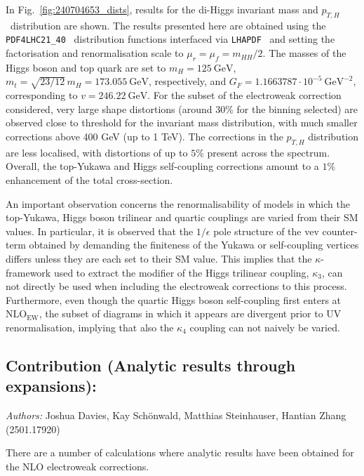In Fig.~\ref{fig:240704653_dists}, results for the di-Higgs invariant mass and $p_{T,H}$~distribution are shown.
The results presented here are obtained using the \texttt{PDF4LHC21\_40}~\cite{PDF4LHCWorkingGroup:2022cjn} distribution functions interfaced via \texttt{LHAPDF}~\cite{Buckley:2014ana} and setting the factorisation and renormalisation scale to $\mu_r = \mu_f = m_{HH}/2$. The masses of the Higgs boson and top quark are set to $m_H = 125~\mathrm{GeV}$, $m_t = \sqrt{23/12}\,m_H =173.055~\mathrm{GeV}$, respectively, and $G_F = 1.1663787 \cdot 10^{-5} \ \mathrm{GeV}^{-2}$, corresponding to $v=246.22~\mathrm{GeV}$.
For the subset of the electroweak correction considered, very large shape distortions (around $30\%$ for the binning selected) are observed close to threshold for the invariant mass distribution, with much smaller corrections above 400 GeV (up to 1 TeV).
The corrections in the $p_{T,H}$ distribution are less localised, with distortions of up to $5\%$ present across the spectrum.
Overall, the top-Yukawa and Higgs self-coupling corrections amount to a $1\%$ enhancement of the total cross-section.

An important observation concerns the renormalisability of models in which the top-Yukawa, Higgs boson trilinear and quartic couplings are varied from their SM values.
In particular, it is observed that the $1/\epsilon$ pole structure of the vev counter-term obtained by demanding the finiteness of the Yukawa or self-coupling vertices differs unless they are each set to their SM value.
This implies that the $\kappa$-framework used to extract the modifier of the Higgs trilinear coupling, $\kappa_3$, can not directly be used when including the electroweak corrections to this process.
Furthermore, even though the quartic Higgs boson self-coupling first enters at $\mathrm{NLO}_\mathrm{EW}$, the subset of diagrams in which it appears are divergent prior to UV renormalisation, implying that also the $\kappa_4$ coupling can not naively be varied.

\subsection{Contribution (Analytic results through expansions):}

\textit{Authors:} Joshua Davies, Kay Schönwald, Matthias Steinhauser, Hantian Zhang (2501.17920)

There are a number of calculations where analytic results
have been obtained for the NLO electroweak corrections.

